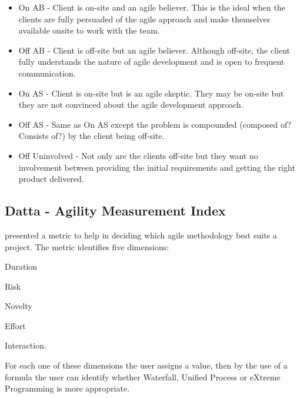 \begin{itemize}
\item On AB - Client is on-site and an agile believer. This is the ideal when the clients are fully persuaded of the agile approach and make themselves available onsite to work with the team.
\item Off AB - Client is off-site but an agile believer. Although off-site, the client fully understands the nature of agile development and is open to frequent communication.
\item On AS - Client is on-site but is an agile skeptic. They may be on-site but they are not convinced about the agile development approach.
\item Off AS - Same as On AS except the problem is compounded (composed of? Consists of?) by the client being off-site.
\item Off Uninvolved - Not only are the clients off-site but they want no involvement between providing the initial requirements and getting the right product delivered.
\end{itemize}

\subsection{Datta - Agility Measurement Index} %
\citet{datta_dissertation} presented a metric to help in deciding which agile methodology best suits a project. The metric identifies five dimensions: 
\begin{inparaenum} [a\upshape)]
\item Duration
\item Risk
\item Novelty
\item Effort
\item Interaction.
\end{inparaenum}
For each one of these dimensions the user assigns a value, then by the use of a formula the user can identify whether Waterfall, Unified Process or eXtreme Programming is more appropriate.


